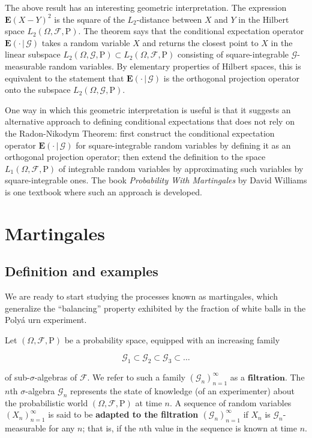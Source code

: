 \documentclass[11pt]{report}
\theoremstyle{plain}
\theoremstyle{definition}
\begin{document}
\noindent The above result has an interesting geometric
interpretation. The expression $\mathbf{E}(X-Y)^2$ is
the square of the $L_2$-distance between $X$ and $Y$
in the Hilbert space
$L_2(\Omega, \mathcal{F},\mathrm{P})$. The theorem
says that the conditional expectation operator
$\mathbf{E}\left(\cdot\,|\,\mathcal{G}\right)$ takes
a random variable $X$ and returns the closest point
to $X$ in the linear subspace
$L_2(\Omega, \mathcal{G},\mathrm{P})\subset
L_2(\Omega, \mathcal{F},\mathrm{P})$
consisting of square-integrable
$\mathcal{G}$-measurable random variables. By
elementary properties of Hilbert spaces, this is
equivalent to the statement that
$\mathbf{E}\left(\cdot\,|\,\mathcal{G}\right)$ is the
orthogonal projection operator onto the subspace
$L_2(\Omega, \mathcal{G},\mathrm{P})$.

One way in which this geometric interpretation is
useful is that it suggests an alternative approach to
defining conditional expectations that does not rely
on the Radon-Nikodym Theorem: first construct the
conditional expectation operator
$\mathbf{E}\left(\cdot\,|\,\mathcal{G}\right)$ for
square-integrable random variables by defining it as
an orthogonal projection operator; then extend the
definition to the space
$L_1(\Omega,\mathcal{F},\mathrm{P})$ of integrable
random variables by approximating such variables by
square-integrable ones. The book \emph{Probability With
Martingales} by David Williams is one textbook where
such an approach is developed.

\chapter{Martingales}

\section{Definition and examples}

We are ready to start studying the processes known as
martingales, which generalize the ``balancing''
property exhibited by the fraction of white balls in
the Poly\'a urn experiment.

Let $(\Omega, \mathcal{F}, \mathrm{P})$ be a
probability space, equipped with an increasing family

\[
\mathcal{G}_1 \subset \mathcal{G}_2 \subset \mathcal{G}_3 \subset \ldots
\]

\noindent of sub-$\sigma$-algebras of $\mathcal{F}$. We refer
to such a family $(\mathcal{G}_n)_{n=1}^\infty$ as a
$\textbf{filtration}$. The $n$th $\sigma$-algebra
$\mathcal{G}_n$ represents the state of knowledge (of
an experimenter) about the probabilistic world
$(\Omega, \mathcal{F}, \mathrm{P})$ at time $n$. A
sequence of random variables $(X_n)_{n=1}^\infty$ is
said to be \textbf{adapted to the filtration
$(\mathcal{G}_n)_{n=1}^\infty$} if $X_n$ is
$\mathcal{G}_n$-measurable for any $n$; that is, if
the $n$th value in the sequence is known at time $n$.
\end{document}
